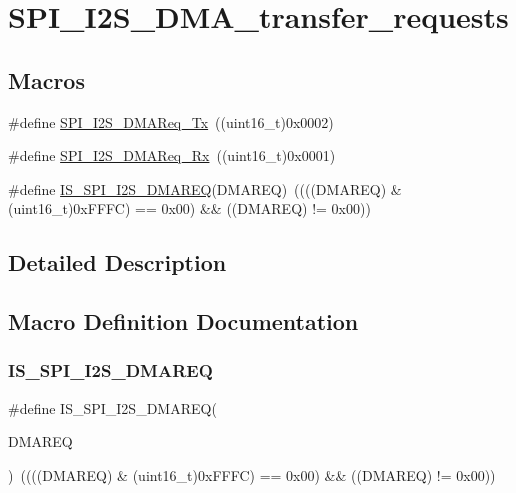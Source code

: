 \hypertarget{group___s_p_i___i2_s___d_m_a__transfer__requests}{}\section{S\+P\+I\+\_\+\+I2\+S\+\_\+\+D\+M\+A\+\_\+transfer\+\_\+requests}
\label{group___s_p_i___i2_s___d_m_a__transfer__requests}
\subsection*{Macros}
\begin{DoxyCompactItemize}
\item 
\#define \mbox{\hyperlink{group___s_p_i___i2_s___d_m_a__transfer__requests_ga05f55a18c83aaa945d99200d012e5e2a}{S\+P\+I\+\_\+\+I2\+S\+\_\+\+D\+M\+A\+Req\+\_\+\+Tx}}~((uint16\+\_\+t)0x0002)
\item 
\#define \mbox{\hyperlink{group___s_p_i___i2_s___d_m_a__transfer__requests_gaa7f680295cdc1af9b086bf51312f15f3}{S\+P\+I\+\_\+\+I2\+S\+\_\+\+D\+M\+A\+Req\+\_\+\+Rx}}~((uint16\+\_\+t)0x0001)
\item 
\#define \mbox{\hyperlink{group___s_p_i___i2_s___d_m_a__transfer__requests_ga6a8f97093494f2331dbdf9295d7c2c6b}{I\+S\+\_\+\+S\+P\+I\+\_\+\+I2\+S\+\_\+\+D\+M\+A\+R\+EQ}}(D\+M\+A\+R\+EQ)~((((D\+M\+A\+R\+EQ) \& (uint16\+\_\+t)0x\+F\+F\+F\+C) == 0x00) \&\& ((\+D\+M\+A\+R\+E\+Q) != 0x00))
\end{DoxyCompactItemize}


\subsection{Detailed Description}


\subsection{Macro Definition Documentation}
\mbox{\label{group___s_p_i___i2_s___d_m_a__transfer__requests_ga6a8f97093494f2331dbdf9295d7c2c6b}} 
\subsubsection{\texorpdfstring{IS\_SPI\_I2S\_DMAREQ}{IS\_SPI\_I2S\_DMAREQ}}
{\footnotesize\ttfamily \#define I\+S\+\_\+\+S\+P\+I\+\_\+\+I2\+S\+\_\+\+D\+M\+A\+R\+EQ(\begin{DoxyParamCaption}\item[{}]{D\+M\+A\+R\+EQ }\end{DoxyParamCaption})~((((D\+M\+A\+R\+EQ) \& (uint16\+\_\+t)0x\+F\+F\+F\+C) == 0x00) \&\& ((\+D\+M\+A\+R\+E\+Q) != 0x00))}

